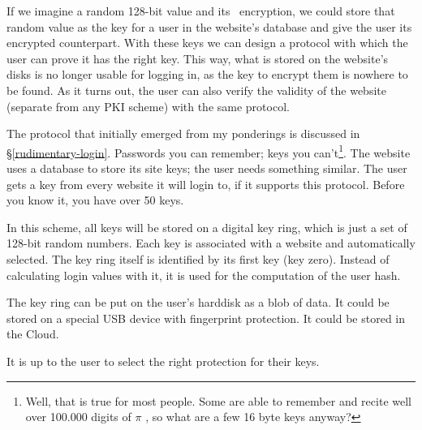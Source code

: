 \par
If we imagine a random 128-bit value and its \AES\ encryption, we could store that random value as the key for a user in the website's database and give the user its encrypted counterpart.
With these keys we can design a protocol with which the user can prove it has the right key.
This way, what is stored on the website's disks is no longer usable for logging in, as the key to encrypt them is nowhere to be found.
As it turns out, the user can also verify the validity of the website (separate from any PKI scheme) with the same protocol.
\par
The protocol that initially emerged from my ponderings is discussed  in §\ref{rudimentary-login}.
Passwords you can remember; keys you can't\footnote{Well, that is true for most people.
Some are able to remember and recite well over 100.000 digits of \(\pi\) \cite{pi-world-ranking-list}, so what are a few 16 byte keys anyway?}.
The website uses a database to store its site keys;
the user needs something similar.
The user gets a key from every website it will login to, if it supports this protocol.
Before you know it, you have over 50 keys.
\par
In this scheme, all keys will be stored on a digital key ring, which is just a set of 128-bit random numbers.
Each key is associated with a website and automatically selected.
The key ring itself is identified by its first key (key zero).
Instead of calculating login values with it, it is used for the computation of the user hash.
\par
The key ring can be put on the user's harddisk as a blob of data.
It could be stored on a special USB device with fingerprint protection.
It could be stored in the Cloud.
\par
It is up to the user to select the right protection for their keys.

